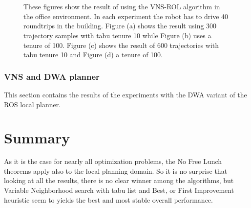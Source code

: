 \begin{figure}[thpb]
   \myfloatalign
    \tiny
    \centering
    
    \\
    \\
    {
    \captionsetup[subfigure]{labelformat=empty} 
    }


    \caption[Experiment: VNS-ROL office]{These figures show the result of using the VNS-ROL algorithm in the office environment. In each experiment the robot has to drive 40 roundtrips in the building. Figure (a) shows the result using 300 trajectory samples with tabu tenure 10 while Figure (b) uses a tenure of 100. Figure (c) shows the result of 600 trajectories with tabu tenure 10 and Figure (d) a tenure of 100.}  
     \label{fig:fig_logo_rol}
\end{figure} 
 
\subsubsection{VNS and DWA planner}
This section contains the results of the experiments with the DWA variant of the ROS local planner. 

\section{Summary}
As it is the case for nearly all optimization problems, the No Free Lunch theorems \cite{wolpert1997no} apply also to the local planning domain. 
So it is no surprise that looking at all the results, there is no clear winner among the algorithms, but Variable Neighborhood search with tabu list and Best, or First Improvement heuristic seem to yields the best and most stable overall performance. 

